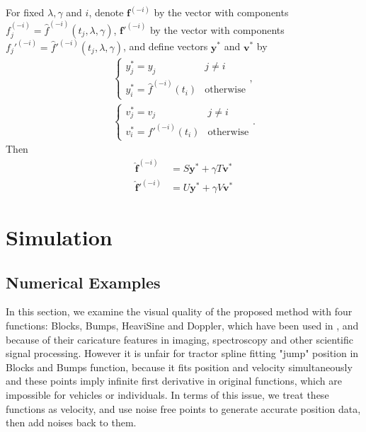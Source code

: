 \begin{lemma} \label{cvlemma}
For fixed $\lambda,\gamma$ and $i$, denote $\mathbf{f}^{(-i)}$ by the vector with components $f_j^{(-i)}=\hat{f}^{(-i)}(t_j,\lambda,\gamma)$,  $\mathbf{f}'^{(-i)}$ by the vector with components $f_j'^{(-i)}=\hat{f}'^{(-i)}(t_j,\lambda,\gamma)$, and define vectors $\mathbf{y}^*$ and $\mathbf{v}^*$ by 
\begin{align}
\begin{cases}
y_j^*=y_j &j \neq i\\
y_i^*=\hat{f}^{(-i)}(t_i) &\mbox{otherwise}
\end{cases},\\
\begin{cases}
v_j^*=v_j &j \neq i\\
v_i^*=\hat{f}'^{(-i)}(t_i) &\mbox{otherwise}
\end{cases}.
\end{align}
Then
\begin{align}
\mathbf{\hat{f}}^{(-i)}&=S\mathbf{y}^*+\gamma T\mathbf{v}^*\\
\mathbf{\hat{f}}'^{(-i)}&=U\mathbf{y}^*+\gamma V\mathbf{v}^*
\end{align}
\end{lemma}


\section{Simulation} %


\subsection{Numerical Examples}

In this section, we examine the visual quality of the proposed method with four functions: Blocks, Bumps, HeaviSine and Doppler, which have been used in \cite{donoho1994ideal}, \cite{donoho1995adapting} and \cite{abramovich1998wavelet} because of their caricature features in imaging, spectroscopy and other scientific signal processing. However it is unfair for tractor spline fitting "jump" position in Blocks and Bumps function, because it fits position and velocity simultaneously and these points imply infinite first derivative in original functions, which are impossible for vehicles or individuals. In terms of this issue, we treat these functions as velocity, and use noise free points to generate accurate position data, then add noises back to them.

